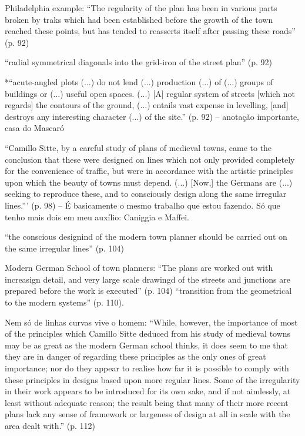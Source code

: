 \documentclass[12pt, a4paper]{book} %
\begin{document}
        Philadelphia example: ``The regularity of the plan has been in various parts broken by traks which had been established before the growth of the town reached these points, but has tended to reasserts itself after passing these roads'' (p. 92)

        ``radial symmetrical diagonals into the grid-iron of the street plan'' (p. 92)

        *``acute-angled plots (...) do not lend (...) production (...) of (...) groups of buildings or (...) useful open spaces. (...) [A] regular system of streets [which not regards] the contours of the ground, (...) entails vast expense in levelling, [and] destroys any interesting character (...) of the site.'' (p. 92) – anotação importante, casa do Mascaró

        ``Camillo Sitte, by a careful study of plans of medieval towns, came to the conclusion that these were designed on lines which not only provided completely for the convenience of traffic, but were in accordance with the artistic principles upon which the beauty of towns must depend. (...) [Now,] the Germans are (...) seeking to reproduce these, and to consciously design along the same irregular lines.''' (p. 98) – É basicamente o mesmo trabalho que estou fazendo. Só que tenho mais dois em meu auxílio: Caniggia e Maffei.

        ``the conscious designind of the modern town planner should be carried out on the same irregular lines'' (p. 104)

        Modern German School of town planners: ``The plans are worked out with increasign detail, and very large scale drawingd of the streets and junctions are prepared before the work is executed'' (p. 104)
        ``transition from the geometrical to the modern systems'' (p. 110).

        Nem só de linhas curvas vive o homem: ``While, however, the importance of most of the principles which Camillo Sitte deduced from his study of medieval towns may be as great as the modern German school thinks, it does seem to me that they are in danger of regarding these principles as the only ones of great importance; nor do they appear to realise how far it is possible to comply with these principles in designs based upon more regular lines. Some of the irregularity in their work appears to be introduced for its own sake, and if not aimlessly, at least without adequate reason; the result being that many of their more recent plans lack any sense of framework or largeness of design at all in scale with the area dealt with.'' (p. 112)
\end{document}
